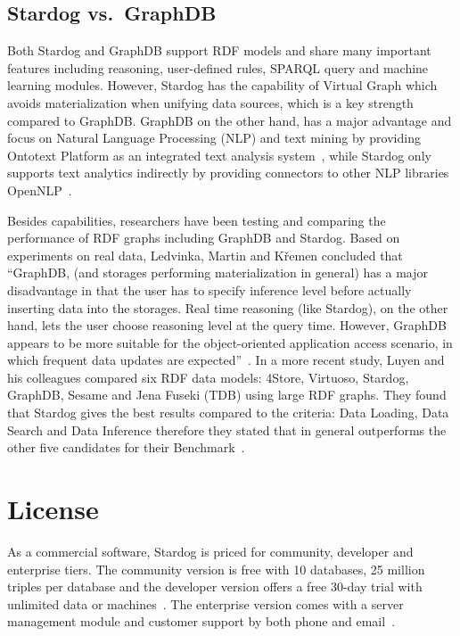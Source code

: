 	\subsection{Stardog vs.\ GraphDB}
		Both Stardog and GraphDB support RDF models and share many 
		important features including reasoning, user-defined rules, SPARQL 
		query and machine learning modules. However, Stardog has the 
		capability of Virtual Graph which avoids materialization when unifying 
		data sources, which is a key strength compared to GraphDB.\@ 
		GraphDB on the other hand, has a major advantage and focus on 
		Natural Language Processing (NLP) and text mining by providing 
		Ontotext Platform as an integrated text analysis 
		system~\cite{hid-sp18-405-www-stardog-ontotext}, while Stardog only 
		supports text analytics indirectly by providing connectors to other NLP 
		libraries OpenNLP~\cite{hid-sp18-405-www-stardog-docs}. 
		
		Besides capabilities, researchers have been testing and comparing the 
		performance of RDF graphs including GraphDB and Stardog. Based on 
		experiments on real data, Ledvinka, Martin and K{\v{r}}emen concluded 
		that ``GraphDB, (and storages performing materialization in general) 
		has a major disadvantage in that the user has to specify inference level 
		before actually inserting data into the storages. Real time reasoning (like 
		Stardog), on the other hand, lets the user choose reasoning level at the 
		query time. However, GraphDB appears to be more suitable for the 
		object-oriented application access scenario, in which frequent data 
		updates are 
		expected''~\cite{hid-sp18-405-ledvinka2015object-stardog}. In a more 
		recent study, Luyen and his colleagues compared six RDF data models: 
		4Store, Virtuoso, Stardog, GraphDB, Sesame and Jena Fuseki (TDB) 
		using large RDF graphs. They found that Stardog gives the best results 
		compared to the criteria: Data Loading, Data Search and Data Inference 
		therefore they stated that in general outperforms the other five 
		candidates for their 
		Benchmark~\cite{hid-sp18-405-luyen2016development-stardog}.


\section{License}
\label{s:license}
	As a commercial software, Stardog is priced for community, developer and 
	enterprise tiers. The community version is free with 10 databases, 25 
	million triples per database and the developer version offers a free 30-day 
	trial with unlimited data or 
	machines~\cite{hid-sp18-405-www-stardog-predictiveanalyticstoday}. The 
	enterprise version comes with a server management module and customer 
	support by both phone and email~\cite{hid-sp18-405-www-stardog-docs}.


